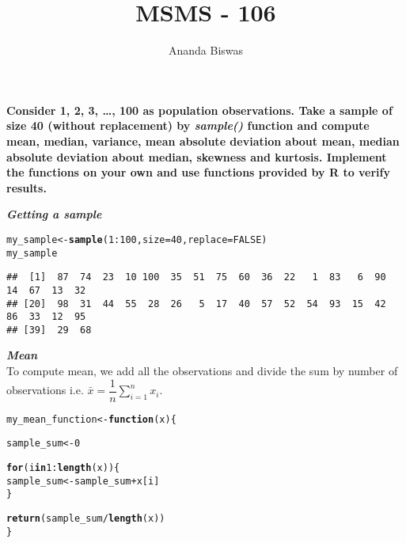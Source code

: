 \documentclass[11pt, a4paper]{article}\usepackage[]{graphicx}\usepackage[]{xcolor}
\title{MSMS - 106}
\author{Ananda Biswas}
\date{}
\makeatletter
\newcommand{\hlnum}[1]{\textcolor[rgb]{0.686,0.059,0.569}{#1}}%
\newcommand{\hlopt}[1]{\textcolor[rgb]{0,0,0}{#1}}%
\newcommand{\hldef}[1]{\textcolor[rgb]{0.345,0.345,0.345}{#1}}%
\newcommand{\hlkwa}[1]{\textcolor[rgb]{0.161,0.373,0.58}{\textbf{#1}}}%
\newcommand{\hlkwb}[1]{\textcolor[rgb]{0.69,0.353,0.396}{#1}}%
\newcommand{\hlkwc}[1]{\textcolor[rgb]{0.333,0.667,0.333}{#1}}%
\newcommand{\hlkwd}[1]{\textcolor[rgb]{0.737,0.353,0.396}{\textbf{#1}}}%
\newenvironment{kframe}{%
 \def\at@end@of@kframe{}%
 \ifinner\ifhmode%
  \def\at@end@of@kframe{\end{minipage}}%
  \begin{minipage}{\columnwidth}%
 \fi\fi%
 \def\FrameCommand##1{\hskip\@totalleftmargin \hskip-\fboxsep
 \colorbox{shadecolor}{##1}\hskip-\fboxsep
     \hskip-\linewidth \hskip-\@totalleftmargin \hskip\columnwidth}%
 \MakeFramed {\advance\hsize-\width
   \@totalleftmargin\z@ \linewidth\hsize
   \@setminipage}}%
 {\par\unskip\endMakeFramed%
 \at@end@of@kframe}
\newenvironment{knitrout}{}{} %
\makeatother
\begin{document}
\maketitle

\smallpencil \hspace{0.25cm} \textbf{Consider 1, 2, 3, \ldots, 100 as population observations. Take a sample of size 40 (without replacement) by \textit{sample()} function and compute mean, median, variance, mean absolute deviation about mean, median absolute deviation about median, skewness and kurtosis. Implement the functions on your own and use functions provided by R to verify results.}

\vspace{0.5cm}

\faArrowAltCircleRight[regular] \textit{\textbf{Getting a sample}}

\begin{knitrout}\footnotesize
{}\color{fgcolor}\begin{kframe}
\begin{alltt}
\hldef{my_sample} \hlkwb{<-} \hlkwd{sample}\hldef{(}\hlnum{1}\hlopt{:}\hlnum{100}\hldef{,} \hlkwc{size} \hldef{=} \hlnum{40}\hldef{,} \hlkwc{replace} \hldef{=} \hlnum{FALSE}\hldef{)}
\hldef{my_sample}
\end{alltt}
\begin{verbatim}
##  [1]  87  74  23  10 100  35  51  75  60  36  22   1  83   6  90  14  67  13  32
## [20]  98  31  44  55  28  26   5  17  40  57  52  54  93  15  42  86  33  12  95
## [39]  29  68
\end{verbatim}
\end{kframe}
\end{knitrout}

\faArrowAltCircleRight[regular] \textit{\textbf{Mean}} \\

To compute mean, we add all the observations and divide the sum by number of observations i.e. $\bar{x} = \dfrac{1}{n} \sum \limits_{i = 1}^{n} x_{i}$.

\begin{knitrout}\footnotesize
{}\color{fgcolor}\begin{kframe}
\begin{alltt}
\hldef{my_mean_function} \hlkwb{<-} \hlkwa{function}\hldef{(}\hlkwc{x}\hldef{)\{}

  \hldef{sample_sum} \hlkwb{<-} \hlnum{0}

  \hlkwa{for} \hldef{(i} \hlkwa{in} \hlnum{1}\hlopt{:}\hlkwd{length}\hldef{(x)) \{}
    \hldef{sample_sum} \hlkwb{<-} \hldef{sample_sum} \hlopt{+} \hldef{x[i]}
  \hldef{\}}

  \hlkwd{return}\hldef{(sample_sum} \hlopt{/} \hlkwd{length}\hldef{(x))}
\hldef{\}}
\end{alltt}
\end{kframe}
\end{knitrout}
\end{document}
